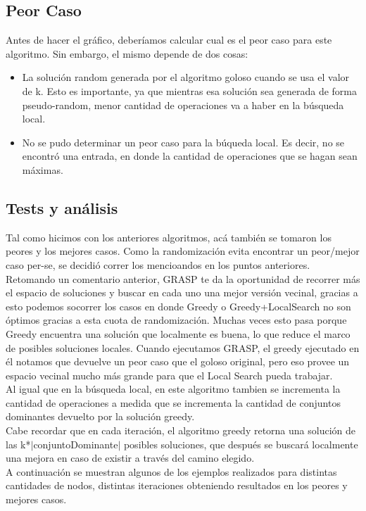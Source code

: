 \subsection{Peor Caso}
Antes de hacer el gráfico, deberíamos calcular cual es el peor caso para este algoritmo. Sin embargo, el mismo depende de dos cosas:
\begin{itemize}
\item La solución random generada por el algoritmo goloso cuando se usa el valor de k. 	Esto es importante, ya que mientras esa solución sea generada de forma pseudo-random, menor cantidad
	de operaciones va a haber en la búsqueda local.
\item No se pudo determinar un peor caso para la búqueda local. Es decir, no se encontró una entrada, en donde la
	cantidad de operaciones que se hagan sean máximas.
\end{itemize}

\subsection{Tests y análisis}
Tal como hicimos con los anteriores algoritmos, acá también se tomaron los peores y los mejores casos. Como la randomización evita encontrar un peor/mejor caso per-se, se 
decidió correr los mencioandos
en los puntos anteriores. Retomando un comentario anterior, GRASP te da la oportunidad de recorrer más el espacio de soluciones y buscar en cada uno una mejor versión vecinal, 
gracias a esto podemos socorrer los 
casos en donde Greedy o Greedy+LocalSearch no son óptimos gracias a esta cuota de randomización. Muchas veces esto pasa porque Greedy encuentra una solución que localmente es 
buena, lo que reduce el marco 
de posibles soluciones locales. Cuando ejecutamos GRASP, el greedy ejecutado en él notamos que devuelve un peor caso que el goloso original, pero eso provee un espacio vecinal 
mucho más grande para que el Local
Search pueda trabajar. \\
Al igual que en la búsqueda local, en este algoritmo tambien se incrementa la cantidad de operaciones a medida
que se incrementa la cantidad de conjuntos dominantes devuelto por la solución greedy.\\
Cabe recordar que en cada iteración, el algoritmo greedy retorna una solución de las k*$|$conjuntoDominante$|$ posibles soluciones, que después se buscará localmente una mejora 
en caso de existir a través del camino elegido.\\
A continuación se muestran algunos de los ejemplos realizados para distintas cantidades de nodos, distintas iteraciones obteniendo resultados en los peores y mejores casos.







